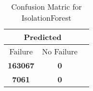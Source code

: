 \begin{table}[] 
\caption{Confusion Matric for IsolationForest} 
\label{Table: Prediction Accuracy-DMDIsolationForestSVMEKF-ignoreReflection-Reflection} 
\centering 
\begin{tabular} 
 {@{}ccc@{}} 
\toprule 
\multicolumn{2}{c}{\textbf{Predicted}}
 \\ \midrule 
\multicolumn{1}{|c|}{Failure} & 
\multicolumn{1}{c|}{No Failure}
 \\ \midrule 
\multicolumn{1}{|c|}{\color{green}\textbf{163067}} & 
\multicolumn{1}{c|}{\color{green}\textbf{0}}
 \\ \midrule 
\multicolumn{1}{|c|}{\color{red}\textbf{7061}} & 
\multicolumn{1}{c|}{\color{green}\textbf{0}}
 \\ \bottomrule 
\end{tabular} 
\end{table} 
